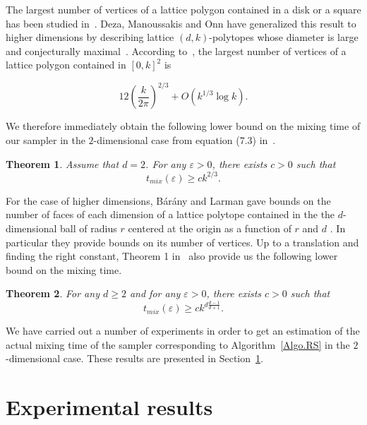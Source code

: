 \documentclass[a4paper]{article}
\newtheorem{theorem}{Theorem}
\begin{document}
The largest number of vertices of a lattice polygon contained in a disk or a square has been studied in~\cite{AcketaZunic1995,T91,BB91}. Deza, Manoussakis and Onn have generalized this result to higher dimensions by describing lattice $(d,k)$-polytopes whose diameter is large and conjecturally maximal~\cite{DezaManoussakisOnn2018}. According to~\cite{AcketaZunic1995}, the largest number of vertices of a lattice polygon contained in $[0,k]^2$ is

\begin{equation}\label{Eqn.Deza}
  12\left(\frac{k}{2\pi}\right)^{2/3}+O(k^{1/3}\log{k})\mbox{.}
\end{equation}

We therefore immediately obtain the following lower bound on the mixing time of our sampler in the $2$-dimensional case from equation (7.3) in~\cite{levin2009markov}.

\begin{theorem}\label{Thm.Lowerbound}
Assume that $d=2$. For any $\varepsilon>0$, there exists $c>0$ such that
$$
t_{mix}(\varepsilon)\geq{ck^{2/3}}\mbox{.}
$$
\end{theorem}

For the case of higher dimensions,  B{\'a}r{\'a}ny and Larman gave bounds on the number of faces of each dimension of a lattice polytope contained in the the $d$-dimensional ball of radius $r$ centered at the origin as a function of $r$ and $d$ \cite{barany1998convex}. In particular they provide bounds on its number of vertices. Up to a translation and finding the right constant, Theorem 1 in~\cite{barany1998convex} also provide us the following lower bound on the mixing time.

\begin{theorem}
  For any $d\geq 2$ and for any $\varepsilon>0$, there exists $c>0$ such that
  $$
  t_{mix}(\varepsilon)\geq ck^{d \frac{d-1}{d+1}}\mbox{.}
  $$
\end{theorem}

We have carried out a number of experiments in order to get an estimation of the actual mixing time of the sampler corresponding to Algorithm~\ref{Algo.RS} in the $2$-dimensional case. These results are presented in Section~\ref{Sec.Res}.

\section{Experimental results}\label{Sec.Res}
\end{document}
